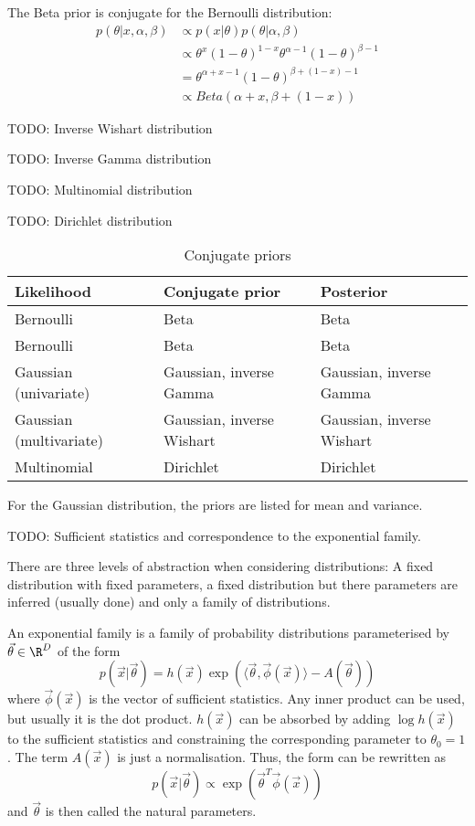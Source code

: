 The Beta prior is conjugate for the Bernoulli distribution:
\begin{align*}
    p(\theta | x, \alpha, \beta) &\propto p(x | \theta) p(\theta | \alpha, \beta) \\
    &\propto \theta^x (1 - \theta)^{1-x} \theta^{\alpha-1}(1-\theta)^{\beta - 1} \\
    &= \theta^{\alpha + x - 1} (1 - \theta)^{\beta + (1 - x) - 1} \\
    &\propto Beta(\alpha + x, \beta + (1 - x))
\end{align*}

TODO: Inverse Wishart distribution

TODO: Inverse Gamma distribution

TODO: Multinomial distribution

TODO: Dirichlet distribution

\begin{table}[]
\begin{tabular}{@{}lll@{}}
\toprule
Likelihood  & Conjugate prior          & Posterior                \\ \midrule
Bernoulli   & Beta                     & Beta                     \\
Bernoulli   & Beta                     & Beta                     \\
Gaussian (univariate)      & Gaussian, inverse Gamma   & Gaussian, inverse Gamma   \\
Gaussian (multivariate)    & Gaussian, inverse Wishart & Gaussian, inverse Wishart \\
Multinomial & Dirichlet                & Dirichlet                \\ \bottomrule
\end{tabular}
\caption {Conjugate priors}
\end{table}
For the Gaussian distribution, the priors are listed for mean and variance.

TODO: Sufficient statistics and correspondence to the exponential family.

There are three levels of abstraction when considering distributions:
A fixed distribution with fixed parameters,
a fixed distribution but there parameters are inferred (usually done)
and only a family of distributions.

An exponential family is a family of probability distributions
parameterised by $\vec{\theta} \in \R^D$ of the form
\begin{equation*}
    p(\vec{x} | \vec{\theta}) = h(\vec{x})
        \exp(\langle \vec{\theta}, \vec{\phi}(\vec{x}) \rangle - A(\vec{\theta}))
\end{equation*}
where $\vec{\phi}(\vec{x})$ is the vector of sufficient statistics.
Any inner product can be used, but usually it is the dot product.
$h(\vec{x})$ can be absorbed by adding $\log h(\vec{x})$ to the
sufficient statistics and constraining the corresponding parameter
to $\theta_0 = 1$.
The term $A(\vec{x})$ is just a normalisation.
Thus, the form can be rewritten as
\begin{equation*}
    p(\vec{x} | \vec{\theta}) \propto \exp(\vec{\theta}^T \vec{\phi}(\vec{x}))
\end{equation*}
and $\vec{\theta}$ is then called the natural parameters.

